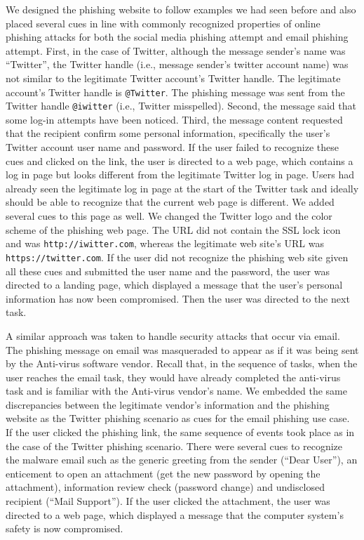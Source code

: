 We designed the phishing website to follow examples we had seen before and also placed several cues in line with commonly recognized properties of online phishing attacks \cite{ftc2019} for both the social media phishing attempt and email phishing attempt. First, in the case of Twitter, although the message sender's name was ``Twitter'', the Twitter handle (i.e., message sender's twitter account name) was not similar to the legitimate Twitter account's Twitter handle. The legitimate account's Twitter handle is \texttt{@Twitter}. The phishing message was sent from the Twitter handle \texttt{@iwitter} (i.e., Twitter misspelled). Second, the message said that some log-in attempts have been noticed. Third, the message content requested that the recipient confirm some personal information, specifically the user's Twitter account user name and password. If the user failed to recognize these cues and clicked on the link, the user is directed to a web page, which contains a log in page but looks different from the legitimate Twitter log in page. Users had already seen the legitimate log in page at the start of the Twitter task and ideally should be able to recognize that the current web page is different. We added several cues to this page as well. We changed the Twitter logo and the color scheme of the phishing web page. The URL did not contain the SSL lock icon and was \texttt{http://iwitter.com}, whereas the legitimate web site's URL was \texttt{https://twitter.com}. If the user did not recognize the phishing web site given all these cues and submitted the user name and the password, the user was directed to a landing page, which displayed a message that the user's personal information has now been compromised. Then the user was directed to the next task.

A similar approach was taken to handle security attacks that occur via email. The phishing message on email was masqueraded to appear as if it was being sent by the Anti-virus software vendor. Recall that, in the sequence of tasks, when the user reaches the email task, they would have already completed the anti-virus task and is familiar with the Anti-virus vendor's name. We embedded the same discrepancies between the legitimate vendor's information and the phishing website as the Twitter phishing scenario as cues for the email phishing use case. If the user clicked the phishing link, the same sequence of events took place as in the case of the Twitter phishing scenario. There were several cues to recognize the malware email such as the generic greeting from the sender (``Dear User''), an enticement to open an attachment (get the new password by opening the attachment), information review check (password change) and undisclosed recipient (``Mail Support''). If the user clicked the attachment, the user was directed to a web page, which displayed a message that the computer system's safety is now compromised.


